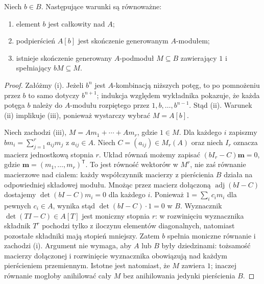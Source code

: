 \begin{lemat}
\label{aa:lem:integrality-determinant}
Niech $b\in B$. Następujące warunki są równoważne:
\begin{enumerate}[label=\textup{(\roman*)}]
\item element $b$ jest całkowity nad $A$;
\item podpierścień $A[b]$ jest skończenie generowanym $A$-modułem;
\item istnieje skończenie generowany $A$-podmoduł $M\subseteq B$
 zawierający $1$ i spełniający $bM\subseteq M$.
\end{enumerate}
\end{lemat}
\begin{proof}
Załóżmy (i). Jeżeli $b^n$ jest $A$-kombinacją niższych
potęg, to po pomnożeniu przez $b$ to samo dotyczy $b^{n+1}$;
indukcja względem wykładnika pokazuje, że każda potęga $b$
należy do $A$-modułu rozpiętego przez
$1,b,\ldots,b^{n-1}$. Stąd (ii). Warunek (ii) implikuje (iii),
ponieważ wystarczy wybrać $M=A[b]$.

Niech zachodzi (iii), $M=Am_1+\cdots+Am_r$, gdzie $1\in M$.
Dla każdego $i$ zapiszmy
$bm_i=\sum_{j=1}^r a_{ij}m_j$ z $a_{ij}\in A$.
Niech $C=(a_{ij})\in M_r(A)$ oraz niech $I_r$ oznacza
macierz jednostkową stopnia $r$. Układ równań możemy zapisać
$(bI_r-C)\mathbf m=0$, gdzie
$\mathbf m=(m_1,\ldots,m_r)^{\mathsf T}$.
To jest równość wektorów w $M^r$, nie zaś równanie
macierzowe nad ciałem: każdy współczynnik macierzy
z pierścienia $B$ działa na odpowiedniej składowej modułu.
Mnożąc przez macierz dołączoną $\operatorname{adj}(bI-C)$
dostajemy $\det(bI-C)m_i=0$ dla każdego $i$.
Ponieważ $1=\sum_i c_im_i$ dla pewnych $c_i\in A$,
wynika stąd $\det(bI-C)\cdot1=0$ w $B$.
Wyznacznik $\det(TI-C)\in A[T]$ jest moniczny stopnia $r$:
w rozwinięciu wyznacznika składnik $T^r$ pochodzi tylko
z iloczynu elementów diagonalnych, natomiast pozostałe
składniki mają stopień mniejszy. Zatem $b$ spełnia
moniczne równanie i zachodzi (i). Argument nie wymaga,
aby $A$ lub $B$ były dziedzinami: tożsamość macierzy
dołączonej i rozwinięcie wyznacznika obowiązują nad każdym
pierścieniem przemiennym. Istotne jest natomiast,
że $M$ zawiera $1$; inaczej równanie mogłoby
anihilować cały $M$ bez anihilowania jedynki pierścienia $B$.
\end{proof}


